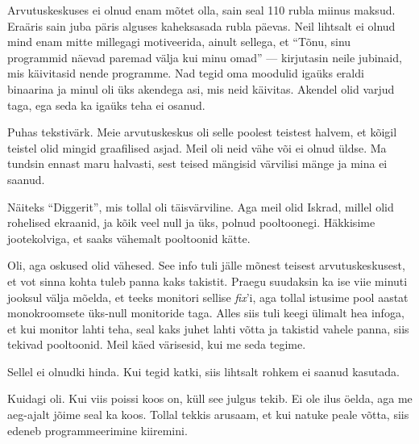 
Arvutuskeskuses ei olnud enam mõtet olla, sain seal 110 rubla miinus maksud. 
Eraäris sain juba päris alguses kaheksasada rubla päevas. Neil lihtsalt ei 
olnud mind enam mitte millegagi motiveerida, ainult 
sellega, et \enquote{Tõnu, sinu programmid näevad paremad välja kui minu omad} --- 
kirjutasin neile jubinaid, mis käivitasid nende programme. 
Nad tegid oma moodulid igaüks eraldi binaarina ja minul oli üks
akendega asi, mis neid käivitas. Akendel olid varjud taga, ega seda ka igaüks 
teha ei osanud. 


Puhas tekstivärk. Meie arvutuskeskus oli selle poolest teistest halvem, et kõigil teistel olid mingid graafilised asjad. Meil oli neid vähe 
või ei olnud üldse. Ma tundsin ennast maru halvasti, sest teised mängisid 
värvilisi mänge ja mina ei saanud. 


Näiteks \enquote{Diggerit}, mis tollal 
oli täisvärviline. Aga meil olid Iskrad, millel olid rohelised 
ekraanid, ja kõik veel null ja üks, polnud pooltoonegi. 
Häkkisime jootekolviga, et saaks vähemalt pooltoonid kätte. 


Oli, aga oskused olid vähesed. See info tuli jälle mõnest teisest 
arvutuskeskusest, et vot sinna kohta tuleb panna kaks takistit. Praegu 
suudaksin ka ise viie minuti jooksul välja 
mõelda, et teeks monitori sellise \emph{fix}'i, aga tollal istusime
pool aastat monokroomsete üks-null monitoride taga. 
Alles siis tuli keegi ülimalt hea infoga, et kui monitor lahti teha, seal 
kaks juhet lahti võtta ja takistid vahele panna, siis tekivad pooltoonid. Meil käed 
värisesid, kui me seda tegime. 


Sellel ei olnudki hinda. Kui tegid katki, siis lihtsalt rohkem ei saanud kasutada.


Kuidagi oli. Kui viis poissi koos on, küll see julgus tekib. Ei ole ilus 
öelda, aga me aeg-ajalt jõime seal ka koos. Tollal tekkis 
arusaam, et kui natuke peale võtta, siis edeneb programmeerimine 
kiiremini. 

